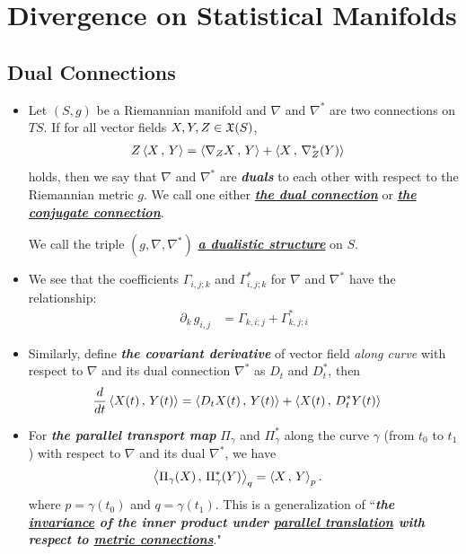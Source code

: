 \documentclass[11pt]{article}
\begin{document}
\section{Divergence on Statistical Manifolds}
\subsection{Dual Connections}
\begin{itemize}
\item
\begin{definition} 
Let $(S, g)$ be a Riemannian manifold and $\nabla$ and $\nabla^{*}$ are two connections on $TS$. If for all vector fields $X, Y, Z \in {\mathfrak X}(S)$, 
\begin{align}
Z\left\langle X\,,\, Y \right\rangle &= \left\langle \nabla_{Z}{X}\,,\, Y \right\rangle + \left\langle X\,,\, \nabla^{*}_{Z}(Y) \right\rangle   \label{eqn: dual_connections}
\end{align} holds, then we say that $\nabla$ and $\nabla^{*}$ are \emph{\textbf{duals}} to each other with respect to the Riemannian metric $g$. We call one either \underline{\emph{\textbf{the dual connection}}}   or \underline{\emph{\textbf{the conjugate connection}}}.

We call the triple $(g, \nabla, \nabla^{*})$ \underline{\emph{\textbf{a dualistic structure}}} on $S$.
\end{definition}

\item We see that the coefficients $\Gamma_{i,j;k}$ and $\Gamma^{*}_{i,j;k}$ for $\nabla$ and $\nabla^{*}$ have the relationship:
\begin{align*}
\partial_k\,g_{i,j} &= \Gamma_{k,i; j} + \Gamma_{k,j; i}^{*}
\end{align*}

\item Similarly, define \emph{\textbf{the covariant derivative}} of vector field \emph{along curve} with respect to $\nabla$ and its dual connection $\nabla^{*}$ as $D_t$ and $D_t^{*}$, then 
\begin{align*}
\frac{d}{dt}\left\langle X(t)\,,\, Y(t) \right\rangle &= \left\langle D_tX(t)\,,\, Y(t) \right\rangle + \left\langle X(t)\,,\, D_t^{*}Y(t) \right\rangle
\end{align*}

\item For \emph{\textbf{the parallel transport map}} $\Pi_{\gamma}$ and $\Pi^{*}_{\gamma}$ along the curve $\gamma$ (from $t_0$ to $t_1$) with respect to $\nabla$ and its dual $\nabla^{*}$, we have 
\begin{align*}
\left\langle \Pi_{\gamma}(X)\,,\, \Pi^{*}_{\gamma}(Y) \right\rangle_q &= \left\langle X\,,\, Y \right\rangle_p.
\end{align*} where $p=\gamma(t_0)$ and $q = \gamma(t_1)$. This is a generalization of ``\emph{\textbf{the \underline{invariance} of the inner product under \underline{parallel translation} with respect to \underline{metric connections}}}."


\end{itemize}
\end{document}
